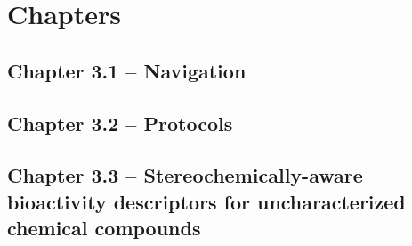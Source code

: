 
\chapter{Chapters}
\newpage


\section{Chapter 3.1 -- Navigation}





\newpage



\section{Chapter 3.2 -- Protocols}





\newpage



\section{Chapter 3.3 -- Stereochemically-aware bioactivity descriptors for uncharacterized chemical compounds}





\newpage


